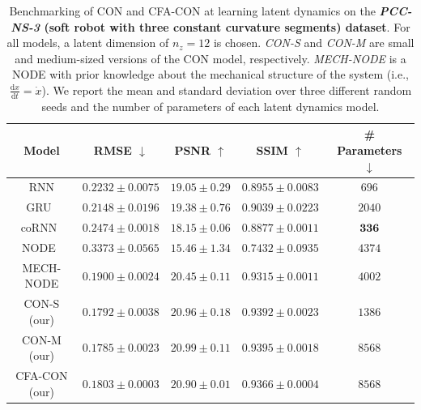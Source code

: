 \begin{table}[ht]
    \centering
    \begin{small}
    \begin{tabular}{c c c c c}
         \toprule
         \textbf{Model} & \textbf{RMSE} $\downarrow$ & \textbf{PSNR} $\uparrow$ & \textbf{SSIM} $\uparrow$ & \textbf{\# Parameters} $\downarrow$ \\
         \midrule
         RNN & $0.2232 \pm 0.0075$ & $19.05 \pm 0.29$ & $0.8955 \pm 0.0083$ & $696$\\
         GRU~\citep{cho2014learning} & $0.2148 \pm 0.0196$ & $19.38 \pm 0.76$ & $0.9039 \pm 0.0223$ & $2040$\\
         coRNN~\citep{rusch2020coupled} & $0.2474 \pm 0.0018$ & $18.15 \pm 0.06$ & $0.8877 \pm 0.0011$ & $\mathbf{336}$\\
         NODE~\citep{chen2018neural} & $0.3373 \pm 0.0565$ & $15.46 \pm 1.34$ & $0.7432 \pm 0.0935$ & $4374$\\
         MECH-NODE & $0.1900 \pm 0.0024$ & $20.45 \pm 0.11$ & $0.9315 \pm 0.0011$ & $4002$\\
         CON-S (our) & $\mathbf{0.1792 \pm 0.0038}$ & $\mathbf{20.96 \pm 0.18}$ & $\mathbf{0.9392 \pm 0.0023}$ & $1386$\\
         CON-M (our) & $\mathbf{0.1785 \pm 0.0023}$ & $\mathbf{20.99 \pm 0.11}$ & $\mathbf{0.9395 \pm 0.0018}$ & $8568$\\
         CFA-CON (our) & $0.1803 \pm 0.0003$ & $20.90 \pm 0.01$ & $0.9366 \pm 0.0004$ & $8568$\\
         \bottomrule
    \end{tabular}
    \end{small}
    \vspace{0.5cm}
    \caption{Benchmarking of \gls{CON} and \gls{CFA-CON} at learning latent dynamics on the \textbf{\emph{PCC-NS-3} (soft robot with three constant curvature segments) dataset}. For all models, a latent dimension of $n_z=12$ is chosen. \emph{CON-S} and \emph{CON-M} are small and medium-sized versions of the \gls{CON} model, respectively. \emph{MECH-NODE} is a \gls{NODE} with prior knowledge about the mechanical structure of the system (i.e., $\frac{\mathrm{d}x}{\mathrm{d}t} = \dot{x}$). We report the mean and standard deviation over three different random seeds and the number of parameters of each latent dynamics model.
}
    \label{tab:apx-con:latent_dynamics_results:pcc_ns-3}
\end{table}

